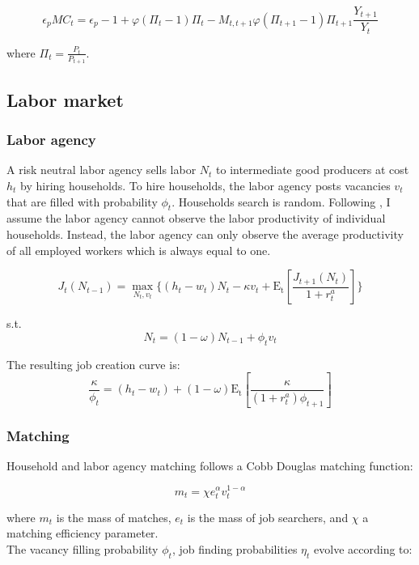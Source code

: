 \documentclass[\econtexRoot/HAFiscal]{subfiles}
\begin{document}
$$ \epsilon_{p} MC_{t} = \epsilon_{p} - 1 + \varphi ( \Pi_{t} -1) \Pi_{t} - M_{t,t+1} \varphi (\Pi_{t+1} -1 ) \Pi_{t+1} \frac{Y_{t+1}}{Y_{t}}$$

where $ \Pi_{t} = \frac{P_{t}}{P_{t+1}}$. \\



\subsection{Labor market}

\subsubsection{Labor agency}

A risk neutral labor agency sells labor $N_{t}$ to intermediate good producers at cost $h_{t}$ by hiring households. To hire households, the labor agency posts vacancies $v_{t}$ that are filled with probability $\phi_{t}$.  Households search is random. Following \cite{Bardoczy2022}, I assume the labor agency cannot observe the labor productivity of individual households. Instead, the labor agency can only observe the average productivity of all employed workers which is always equal to one. 

$$J_{t}(N_{t-1})  = \max_{N_{t},v_{t}} \{( h_{t} - w_{t}) N_{t}- \kappa v_{t} + \mathrm{E_{t}}\left[ \frac{J_{t+1}(N_{t})}{1 + r^{a}_{t}}\right]\}$$

s.t.
$$ N_{t} = (1-\omega)N_{t-1} + \phi_{t} v_{t}$$ 

The resulting job creation curve is:
$$ \frac{\kappa}{\phi_{t}}  = (h_{t} - w_{t})+  (1-\omega)\mathrm{E_{t}}\left[   \frac{\kappa}{(1+r^{a}_{t}) \phi_{t+1}} \right]   $$


\subsubsection{Matching}

Household and labor agency matching follows a Cobb Douglas matching function:

$$m_{t} = \chi e_{t}^{\alpha} v_{t}^{1-\alpha}$$ 

where $m_{t}$ is the mass of matches, $ e_{t} $ is the mass of job searchers, and $\chi$ a matching efficiency parameter.\\

The vacancy filling probability $\phi_{t}$, job finding probabilities $\eta_{t}$ evolve according to:
\end{document}
